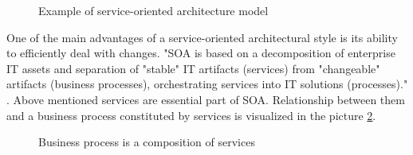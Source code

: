 \begin{figure}[htp] 
\caption{Example of service-oriented architecture model}
\label{fig:soa-architecture}
\end{figure}  

One of the main advantages of a service-oriented architectural style is its ability to efficiently deal with changes. "SOA is based on a decomposition of enterprise IT assets and separation of "stable" IT artifacts (services) from "changeable" artifacts (business processes), orchestrating services into IT solutions (processes)." \cite{website:versioning-in-soa}. %
Above mentioned services are essential part of SOA. Relationship between them and a business process constituted by services is visualized in the picture \ref{fig:business-process-services}.

\begin{figure}[htp] 
\caption{Business process is a composition of services}
\label{fig:business-process-services}
\end{figure} 

